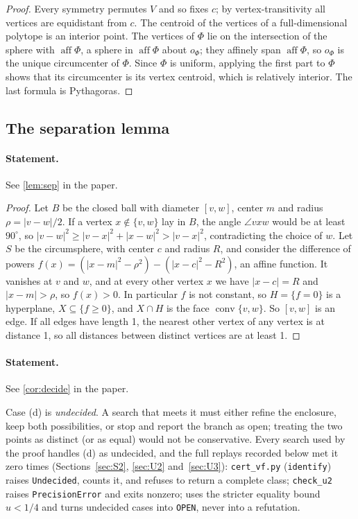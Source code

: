 \documentclass[11pt]{article}
\theoremstyle{definition}
\theoremstyle{remark}
\newcommand{\aff}{\operatorname{aff}}
\newcommand{\conv}{\operatorname{conv}}
\newcommand{\file}[1]{\path{#1}}
\begin{document}
\begin{proof}
Every symmetry permutes $V$ and so fixes $c$; by vertex-transitivity all
vertices are equidistant from $c$. The centroid of the vertices of a
full-dimensional polytope is an interior point. The vertices of $\Phi$ lie
on the intersection of the sphere with $\aff\Phi$, a sphere in $\aff\Phi$
about $o_\Phi$; they affinely span $\aff\Phi$, so $o_\Phi$ is the unique
circumcenter of $\Phi$. Since $\Phi$ is uniform, applying the first part to
$\Phi$ shows that its circumcenter is its vertex centroid, which is
relatively interior. The last formula is Pythagoras.
\end{proof}

\subsection{The separation lemma}

\paragraph{Statement.} See \ref{lem:sep} in the paper.


\begin{proof}
Let $B$ be the closed ball with diameter $[v,w]$, center $m$ and radius
$\rho=|v-w|/2$. If a vertex $x\notin\{v,w\}$ lay in $B$, the angle
$\angle vxw$ would be at least $90^\circ$, so
$|v-w|^2\ge|v-x|^2+|x-w|^2>|v-x|^2$, contradicting the choice of $w$. Let
$S$ be the circumsphere, with center $c$ and radius $R$, and consider the
difference of powers
$f(x)=(|x-m|^2-\rho^2)-(|x-c|^2-R^2)$, an affine function. It vanishes at
$v$ and $w$, and at every other vertex $x$ we have $|x-c|=R$ and
$|x-m|>\rho$, so $f(x)>0$. In particular $f$ is not constant, so
$H=\{f=0\}$ is a hyperplane, $X\subseteq\{f\ge0\}$, and $X\cap H$ is the
face $\conv\{v,w\}$. So $[v,w]$ is an edge. If all edges have length 1,
the nearest other vertex of any vertex is at distance 1, so all distances
between distinct vertices are at least 1.
\end{proof}

\setcounter{theorem}{2}
\paragraph{Statement.} See \ref{cor:decide} in the paper.


Case (d) is \emph{undecided}. A search that meets it must either refine
the enclosure, keep both possibilities, or stop and report the branch as
open; treating the two points as distinct (or as equal) would not be
conservative. Every search used by the proof
handles (d) as undecided, and the full replays recorded below met it
zero times (Sections~\ref{sec:S2}, \ref{sec:U2} and~\ref{sec:U3}):
\texttt{cert\_vf.py} (\texttt{identify}) raises \texttt{Undecided}, counts
it, and refuses to return a complete class; \texttt{check\_u2} raises
\texttt{PrecisionError} and exits nonzero; \file{checks/primary/check_u3} uses the
stricter equality bound $u<1/4$ and turns undecided cases into \texttt{OPEN},
never into a refutation.
\end{document}
